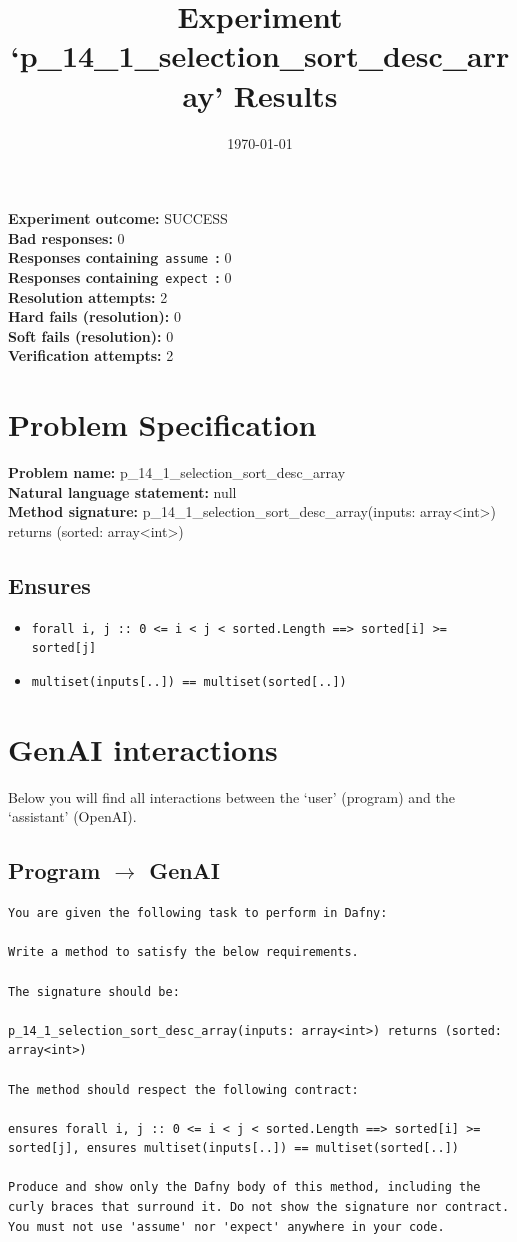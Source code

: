 \documentclass{article}
\begin{document}
\title{Experiment `p\_14\_1\_selection\_sort\_desc\_array' Results}
\author{\today}
\date{}
\maketitle
\textbf{Experiment outcome: }SUCCESS
\\\textbf{Bad responses: }0
\\\textbf{Responses containing}~\texttt{assume}~\textbf{: }0
\\\textbf{Responses containing}~\texttt{expect}~\textbf{: }0
\\\textbf{Resolution attempts: }2
\\\textbf{Hard fails (resolution): }0
\\\textbf{Soft fails (resolution): }0
\\\textbf{Verification attempts: }2
\section*{Problem Specification}
\textbf{Problem name: }p\_14\_1\_selection\_sort\_desc\_array
\\\textbf{Natural language statement: }null
\\\textbf{Method signature: }p\_14\_1\_selection\_sort\_desc\_array(inputs: array<int>) returns (sorted: array<int>)
\subsection*{Ensures}
\begin{itemize}
\item \texttt{forall i, j :: 0 <= i < j < sorted.Length ==> sorted[i] >= sorted[j]}
\item \texttt{multiset(inputs[..]) == multiset(sorted[..])}
\end{itemize}
\clearpage
\section*{GenAI interactions}
Below you will find all interactions between the `user' (program) and the `assistant' (OpenAI).
\subsection*{Program $\rightarrow$ GenAI}
\begin{lstlisting}
You are given the following task to perform in Dafny:

Write a method to satisfy the below requirements.

The signature should be:

p_14_1_selection_sort_desc_array(inputs: array<int>) returns (sorted: array<int>)

The method should respect the following contract:

ensures forall i, j :: 0 <= i < j < sorted.Length ==> sorted[i] >= sorted[j], ensures multiset(inputs[..]) == multiset(sorted[..])

Produce and show only the Dafny body of this method, including the curly braces that surround it. Do not show the signature nor contract. You must not use 'assume' nor 'expect' anywhere in your code.
\end{lstlisting}
\end{document}
